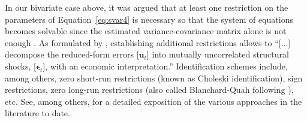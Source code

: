 \documentclass[a4paper,11pt,listof=nochaptergap,oneside,pointednumbers,bibtotoc,bigheadings,liststotoc,hidelinks]{scrbook}
\theoremstyle{mysatz}
\theoremstyle{mydefinition}
\theoremstyle{mytheorem}
\theoremstyle{mybemerkung}
\newcommand{\vect}[1]{\boldsymbol{\mathbf{#1}}}
\begin{document}
In our bivariate case above, it was argued that at least one restriction on the parameters of Equation~\ref{eq:svar4} is necessary \citep{zivot:00} so that the system of equations becomes solvable since the estimated variance-covariance matrix alone is not enough \citep{ludvigsonetal:20a}. As formulated by \citet[p. 212]{lutkepohlkilian:17}, establishing additional restrictions allows to ``[...] decompose the reduced-form errors [$\vect{u}_t$] into mutually uncorrelated structural shocks, [$\vect{\epsilon}_t$], with an economic interpretation.''  Identification schemes include, among others, zero short-run restrictions (known as Choleski identification), sign restrictions, zero long-run restrictions (also called Blanchard-Quah following \citealp{blanchardandquah:89}), etc. See, among others, \citet{lutkepohlkilian:17} for a detailed exposition of the various approaches in the literature to date.
\end{document}
